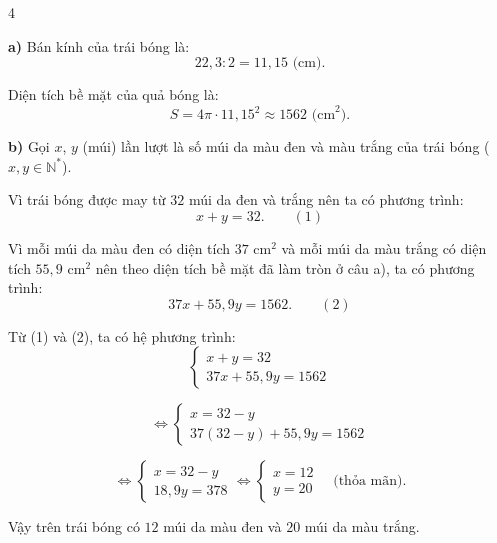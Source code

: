 \begin{Solbook}{4}
 \par \noindent  \textbf {a)} Bán kính của trái bóng là: \[ 22{,}3:2=11{,}15\text { (cm)}. \] \par Diện tích bề mặt của quả bóng là: \[ S=4\pi \cdot 11{,}15^2 \approx 1562\text { (cm}^2\text {)}. \] \par \textbf {b)} Gọi $x$, $y$ (múi) lần lượt là số múi da màu đen và màu trắng của trái bóng ($x,y\in \mathbb {N}^{*}$). \par Vì trái bóng được may từ $32$ múi da đen và trắng nên ta có phương trình: \[ x+y=32. \qquad (1) \] \par Vì mỗi múi da màu đen có diện tích $37$ cm$^2$ và mỗi múi da màu trắng có diện tích $55{,}9$ cm$^2$ nên theo diện tích bề mặt đã làm tròn ở câu a), ta có phương trình: \[ 37x+55{,}9y=1562. \qquad (2) \] \par Từ (1) và (2), ta có hệ phương trình: \[ \begin {cases} x+y=32\\ 37x+55{,}9y=1562 \end {cases} \] \par \[ \Leftrightarrow \begin {cases} x=32-y\\ 37(32-y)+55{,}9y=1562 \end {cases} \] \par \[ \Leftrightarrow \begin {cases} x=32-y\\ 18{,}9y=378 \end {cases} \Leftrightarrow \begin {cases} x=12\\ y=20 \end {cases} \quad \text {(thỏa mãn).} \] \par Vậy trên trái bóng có $12$ múi da màu đen và $20$ múi da màu trắng.  \hfill \qedEX 
\end{Solbook}
